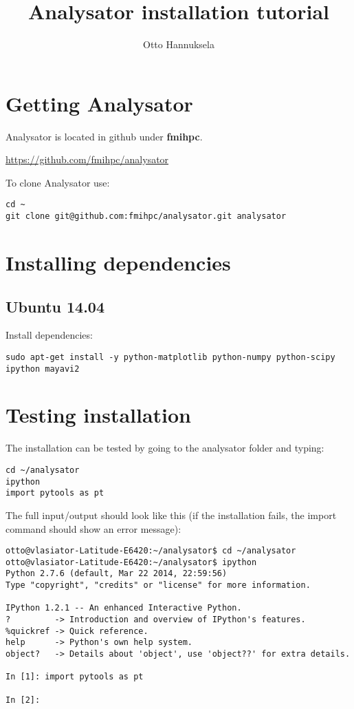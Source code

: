 \documentclass[a4paper,10pt]{article}
\title{Analysator installation tutorial}
\author{Otto Hannuksela}
\begin{document}
\maketitle

\tableofcontents

\newpage

\section{Getting Analysator} 

Analysator is located in github under \textbf{fmihpc}.

\url{https://github.com/fmihpc/analysator}

To clone Analysator use:

\begin{verbatim}
cd ~
git clone git@github.com:fmihpc/analysator.git analysator
\end{verbatim}


\section{Installing dependencies}

\subsection{Ubuntu 14.04}

Install dependencies:

\begin{verbatim}
sudo apt-get install -y python-matplotlib python-numpy python-scipy ipython mayavi2
\end{verbatim}

\section{Testing installation}

The installation can be tested by going to the analysator folder and typing:

\begin{verbatim}
cd ~/analysator
ipython
import pytools as pt
\end{verbatim}

The full input/output should look like this (if the installation fails, the import command should 
show an error message):
\begin{verbatim}
otto@vlasiator-Latitude-E6420:~/analysator$ cd ~/analysator
otto@vlasiator-Latitude-E6420:~/analysator$ ipython
Python 2.7.6 (default, Mar 22 2014, 22:59:56) 
Type "copyright", "credits" or "license" for more information.

IPython 1.2.1 -- An enhanced Interactive Python.
?         -> Introduction and overview of IPython's features.
%quickref -> Quick reference.
help      -> Python's own help system.
object?   -> Details about 'object', use 'object??' for extra details.

In [1]: import pytools as pt

In [2]: 

\end{verbatim}
\end{document}
